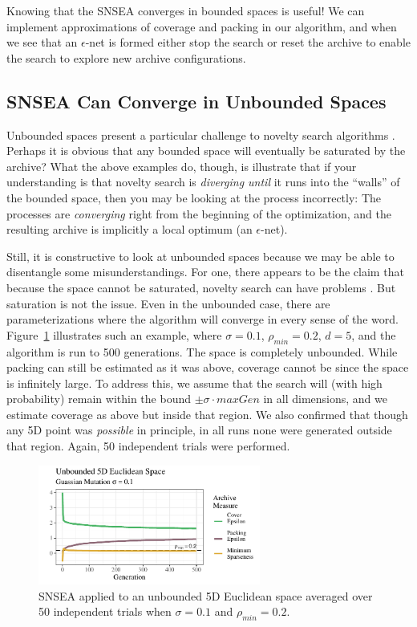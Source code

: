 \documentclass[twoside]{article}
\begin{document}
Knowing that the SNSEA converges in bounded spaces is useful! We can implement approximations of coverage and packing in our algorithm, and when we see that an $\epsilon$-net is formed either stop the search or reset the archive to enable the search to explore new archive configurations.  


\subsection{SNSEA Can Converge in Unbounded Spaces}
\label{subsec:unbounded}

Unbounded spaces present a particular challenge to novelty search algorithms \citep{LehmanStanley2008ssls,Doncieux2019gecco}.  Perhaps it is obvious that any bounded space will eventually be saturated by the archive?  What the above examples do, though, is illustrate that if your understanding is that novelty search is \emph{diverging until} it runs into the ``walls'' of the bounded space, then you may be looking at the process incorrectly:  The processes are \emph{converging} right from the beginning of the optimization, and the resulting archive is implicitly a local optimum (an $\epsilon$-net).

Still, it is constructive to look at unbounded spaces because we may be able to disentangle some misunderstandings.  For one, there appears to be the claim that because the space cannot be saturated, novelty search can have problems \citep{LehmanStanley2008ssls,Doncieux2019gecco}.  But saturation is not the issue.  Even in the unbounded case, there are parameterizations where the algorithm will converge in every sense of the word.  Figure~\ref{fig:unbounded:nopop:0102} illustrates such an example, where $\sigma=0.1$, $\rho_{min}= 0.2$, $d=5$, and the algorithm is run to 500 generations.  The space is completely unbounded.  While packing can still be estimated as it was above, coverage cannot be since the space is infinitely large.  To address this, we assume that the search will (with high probability) remain within the bound $\pm\sigma\cdot maxGen$ in all dimensions, and we estimate coverage as above but inside that region.  We also confirmed that though any 5D point was \emph{possible} in principle, in all runs none were generated outside that region.  Again, 50 independent trials were performed.
%
\begin{figure}[ht]
  \center\includegraphics[width=0.65\textwidth]{Figures/unbounded-s01-r02-NOPOP.pdf}
  \caption{\label{fig:unbounded:nopop:0102} SNSEA applied to an unbounded 5D Euclidean space averaged over 50 independent trials when $\sigma=0.1$ and $\rho_{min}=0.2$.}
\end{figure}
\end{document}
